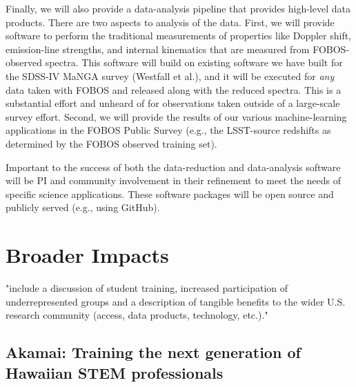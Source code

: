 \documentclass[oneside,11pt]{amsart}
\newcommand{\comment}[2][todo]{{\color{#1}[[{\bf #2}]]}}
\begin{document}
Finally, we will also provide a data-analysis pipeline that provides
high-level data products.  There are two aspects to analysis of the
data.  First, we will provide software to perform the traditional
measurements of properties like Doppler shift, emission-line strengths,
and internal kinematics that are measured from FOBOS-observed spectra.
This software will build on existing software we have built for the
SDSS-IV MaNGA survey (Westfall et al.), and it will be executed for {\it
any} data taken with FOBOS and released along with the reduced spectra.
This is a substantial effort and unheard of for observations taken
outside of a large-scale survey effort.  Second, we will provide the
results of our various machine-learning applications in the FOBOS Public
Survey (e.g., the LSST-source redshifts as determined by the FOBOS
observed training set).

Important to the success of both the data-reduction and data-analysis
software will be PI and community involvement in their refinement to
meet the needs of specific science applications.  These software
packages will be open source and publicly served (e.g., using GitHub).


\section{Broader Impacts}
\label{sec:bi}

"include a discussion of student training, increased participation of
underrepresented groups and a description of tangible benefits to the
wider U.S. research community (access, data products, technology,
etc.)."

\subsection{Akamai: Training the next generation of Hawaiian STEM professionals}
\noindent \comment{1/2 page}
\end{document}
